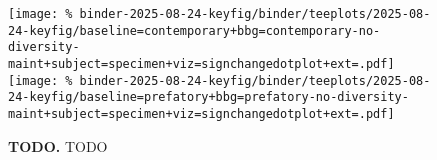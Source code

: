 \begin{figure*}

\texttt{[image: \%
binder-2025-08-24-keyfig/binder/teeplots/2025-08-24-keyfig/baseline=contemporary+bbg=contemporary-no-diversity-maint+subject=specimen+viz=signchangedotplot+ext=.pdf]}%
\texttt{[image: \%
binder-2025-08-24-keyfig/binder/teeplots/2025-08-24-keyfig/baseline=prefatory+bbg=prefatory-no-diversity-maint+subject=specimen+viz=signchangedotplot+ext=.pdf]}

\vspace{-1ex}

\caption{
\textbf{TODO.}
TODO
}

\label{fig:sign-change-nodmaint-vs-nodmaint}

\end{figure*}
